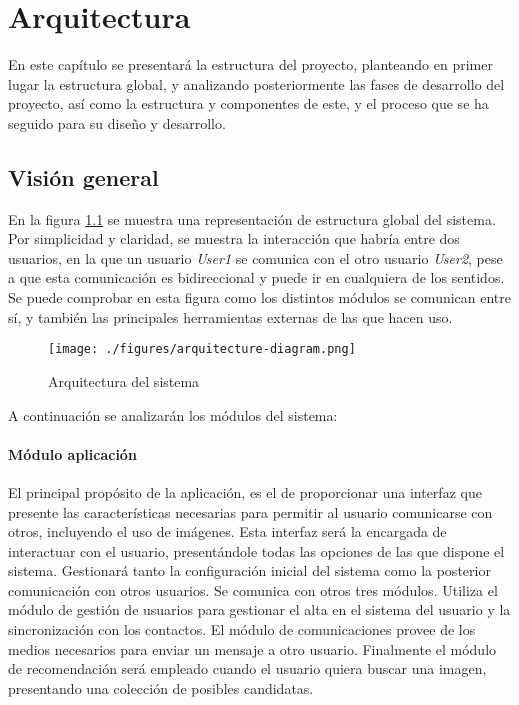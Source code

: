 \chapter{Arquitectura}
\label{chap:arquitectura}

En este capítulo se presentará la estructura del proyecto, planteando en primer lugar la estructura global, y analizando posteriormente las fases de desarrollo del proyecto, así como la estructura y componentes de este, y el proceso que se ha seguido para su diseño y desarrollo. 

\section{Visión general}
En la figura \ref{fig:arquitecture-diagram} se muestra una representación de estructura global del sistema. Por simplicidad y claridad, se muestra la interacción que habría entre dos usuarios, en la que un usuario \textit{User1} se comunica con el otro usuario \textit{User2}, pese a que esta comunicación es bidireccional y puede ir en cualquiera de los sentidos. Se puede comprobar en esta figura como los distintos módulos se comunican entre sí, y también las principales herramientas externas de las que hacen uso.


\begin{figure}[!h]
\begin{center}
\texttt{[image: ./figures/arquitecture-diagram.png]}
\caption[Arquitectura del sistema]{Arquitectura del sistema}
\label{fig:arquitecture-diagram}
\end{center}
\end{figure}


A continuación se analizarán los módulos del sistema:


\subsubsection{Módulo aplicación}
El principal propósito de la aplicación, es el de proporcionar una interfaz que presente las características necesarias para permitir al usuario comunicarse con otros, incluyendo el uso de imágenes. Esta interfaz será la encargada de interactuar con el usuario, presentándole todas las opciones de las que dispone el sistema. Gestionará tanto la configuración inicial del sistema como la posterior comunicación con otros usuarios. Se comunica con otros tres módulos. Utiliza el módulo de gestión de usuarios para gestionar el alta en el sistema del usuario y la sincronización con los contactos. El módulo de comunicaciones provee de los medios necesarios para enviar un mensaje a otro usuario. Finalmente el módulo de recomendación será empleado cuando el usuario quiera buscar una imagen, presentando una colección de posibles candidatas.


